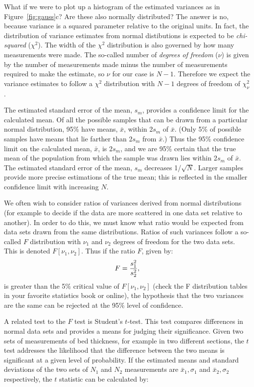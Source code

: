What if we were to plot up a histogram of  the estimated variances as in Figure~\ref{fig:gauss}c?
Are these also normally distributed?  The answer is 
no, because variance is a squared parameter relative to the 
original units.  In fact, the distribution of variance estimates
from normal distibutions is expected to be 
{\it chi-squared}  ($\chi^2$). The width of the $\chi^2$ distribution is also governed by  how many measurements were made.  The so-called number of 
{\it degrees of freedom}  ($\nu$) is given by the number of measurements made
minus the number of measurements required to make the estimate, so
$\nu$ for our case is $N-1$.  Therefore we expect the 
variance estimates to follow a $\chi^2$ distribution with $N-1$ 
degrees of freedom of $\chi^2_{\nu}$.   


The estimated standard error of the mean, $s_m$, provides a confidence limit for the calculated mean. Of
all the possible samples that can be drawn from a particular normal distribution, 95\% have means, $\bar x$, within
2$s_m$ of $\bar x$. (Only 5\% of possible samples have means that lie farther than 2$s_m$ from $\bar x$.) Thus the 95\% confidence limit on the calculated mean, $\bar x$, is 2$s_m$, and we are 95\% certain that the true mean of the
population from which the sample was drawn lies within 2$s_m$ of $\bar x$.
The estimated standard error of the mean, $s_m$
 decreases 1/$\sqrt N$. Larger samples provide more precise estimations of the true mean;  this is reflected
in the smaller confidence limit with increasing $N$.


We often wish to consider ratios of variances  derived from normal distributions (for example
to decide if the data are more scattered in one data set relative
to another).  In order to do this, we must know what ratio would be 
expected from data sets drawn from the same distributions.  Ratios
of such variances follow a so-called 
$F$ distribution with $\nu_1$ and
$\nu_2$ degrees of freedom for the two data sets.  This is 
denoted $F[\nu_1,\nu_2]$.  Thus if the ratio $F$, given by:
$$
{F}={{s_1^2}\over {s_2^2}},
$$
\noindent
is greater than the 5\% critical value of $F[\nu_1,\nu_2]$ (check the
F distribution tables in your favorite statistics book or online), the 
hypothesis  that the two variances are the same can be rejected at the
95\% level of confidence.

A related test to the $F$ test  is 
Student's $t$-test.  This test compares differences in normal data sets and provides a means for judging their significance.  Given two sets of measurements of bed thickness, for example in two different sections, the $t$ test addresses the likelihood that the difference between the two means is significant at a given level of probability.       If the estimated means and standard deviations of the two sets of $N_1$ and $N_2$ measurements are $\bar x_1,\sigma_1$ and $\bar x_2,\sigma_2$ respectively, the $t$ statistic can be calculated by:

